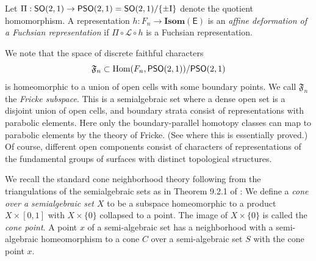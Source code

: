 \documentclass{amsart}
\numberwithin{equation}{section}
\newcommand{\Iso}{\mathrm{Iso}}
\newcommand\Hom{{\rm Hom}}
\newcommand\ra{\rightarrow}
\newcommand\Idd{{\rm I}}
\newcommand\Isom{{\mathbf{Isom}}}
\newcommand\SO{{\mathsf{SO}}}
\newcommand\Lspace{\mathsf E}
\newcommand\PO{{\mathsf{PSO}}}
\theoremstyle{definition}
\theoremstyle{remark}
\begin{document}
Let $\Pi: \SO(2, 1) \ra \PO(2, 1)=\SO(2, 1)/\{\pm \Idd\}$ denote the quotient homomorphism.
A representation $h: F_n \ra \Isom(\Lspace)$ is an {\em affine deformation of a Fuchsian representation} if
$\Pi \circ \mathcal{L}\circ h$ is a Fuchsian representation. 



We note that the space of discrete faithful characters
\[\mathfrak{F}_n\subset \Hom(F_n, \PO(2, 1))/\PO(2, 1)\] 
is homeomorphic to a union of open cells with some boundary points.
We call $\mathfrak{F}_n$ the {\em Fricke subspace}. 
This is a semialgebraic set where a dense open set is a disjoint union of 
open cells, and 
boundary strata consist of representations with parabolic elements. 
Here only the boundary-parallel homotopy classes can map to parabolic elements by 
the theory of Fricke. (See \cite{G09} where this is essentially proved.) 
Of course, different open components 
consist of characters of representations of the fundamental groups of 
surfaces with distinct topological structures. 

We recall the standard cone neighborhood theory following from 
the triangulations of the semialgebraic sets as in Theorem 9.2.1 of  \cite{Bochnak}: 
We define a {\em cone over a semialgebraic set $X$} to be a subspace
homeomorphic  to a product $X\times [0, 1]$ with $X\times \{0\}$ 
collapsed to a point. The image of $X \times \{0\}$ is called the 
{\em cone point}.
A point $x$ of a semi-algebraic set has a neighborhood with a semi-algebraic homeomorphism to a cone $C$ over a semi-algebraic set $S$ 
with the cone point $x$. 
\end{document}
